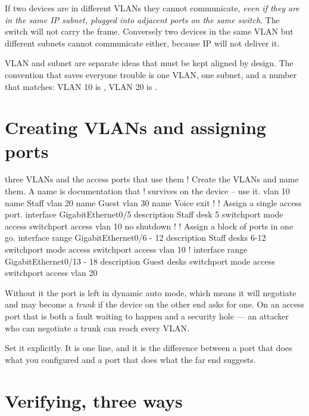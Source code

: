 \begin{alertbox}
If two devices are in different VLANs they cannot communicate, \emph{even if they
are in the same IP subnet, plugged into adjacent ports on the same switch}. The
switch will not carry the frame. Conversely two devices in the same VLAN but
different subnets cannot communicate either, because IP will not deliver it.

VLAN and subnet are separate ideas that must be kept aligned by design. The
convention that saves everyone trouble is one VLAN, one subnet, and a number that
matches: VLAN 10 is , VLAN 20 is .
\end{alertbox}

\section{Creating VLANs and assigning ports}

\begin{config}{three VLANs and the access ports that use them}
! Create the VLANs and name them. A name is documentation that
! survives on the device -- use it.
vlan 10
 name Staff
vlan 20
 name Guest
vlan 30
 name Voice
exit
!
! Assign a single access port.
interface GigabitEthernet0/5
 description Staff desk 5
 switchport mode access
 switchport access vlan 10
 no shutdown
!
! Assign a block of ports in one go.
interface range GigabitEthernet0/6 - 12
 description Staff desks 6-12
 switchport mode access
 switchport access vlan 10
!
interface range GigabitEthernet0/13 - 18
 description Guest desks
 switchport mode access
 switchport access vlan 20
\end{config}

\begin{conceptbox}
Without it the port is left in dynamic auto mode, which means it will negotiate
and may become a \emph{trunk} if the device on the other end asks for one. On an
access port that is both a fault waiting to happen and a security hole --- an
attacker who can negotiate a trunk can reach every VLAN.

Set it explicitly. It is one line, and it is the difference between a port that
does what you configured and a port that does what the far end suggests.
\end{conceptbox}

\section{Verifying, three ways}

